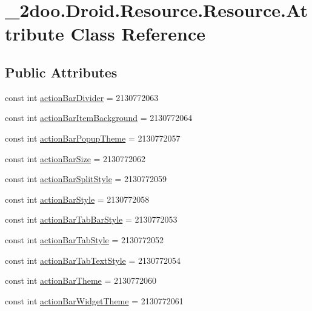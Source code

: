 \hypertarget{class__2doo_1_1_droid_1_1_resource_1_1_attribute}{
\section{\_\-2doo.Droid.Resource.Resource.Attribute Class Reference}
\label{class__2doo_1_1_droid_1_1_resource_1_1_attribute}
}
\subsection*{Public Attributes}
\begin{CompactItemize}
\item 
const int \hyperlink{class__2doo_1_1_droid_1_1_resource_1_1_attribute_56a231fb42d54d2cea70de041f6bf723}{actionBarDivider} = 2130772063
\item 
const int \hyperlink{class__2doo_1_1_droid_1_1_resource_1_1_attribute_3daad9ebff0b1dcb5a9f890d799d451e}{actionBarItemBackground} = 2130772064
\item 
const int \hyperlink{class__2doo_1_1_droid_1_1_resource_1_1_attribute_d85cfd5b41f1289c29c3518c259e7e9f}{actionBarPopupTheme} = 2130772057
\item 
const int \hyperlink{class__2doo_1_1_droid_1_1_resource_1_1_attribute_97e96486337d0366a064ae7a32843a25}{actionBarSize} = 2130772062
\item 
const int \hyperlink{class__2doo_1_1_droid_1_1_resource_1_1_attribute_df230fc290f081e05a70c7d32bf0efe4}{actionBarSplitStyle} = 2130772059
\item 
const int \hyperlink{class__2doo_1_1_droid_1_1_resource_1_1_attribute_ca8d6c2c8f1d77d4b023469362e794e6}{actionBarStyle} = 2130772058
\item 
const int \hyperlink{class__2doo_1_1_droid_1_1_resource_1_1_attribute_97f1f887f9a9c9386ef91d4c5e865d26}{actionBarTabBarStyle} = 2130772053
\item 
const int \hyperlink{class__2doo_1_1_droid_1_1_resource_1_1_attribute_5e0937b0556820fb8374ab519a87e38d}{actionBarTabStyle} = 2130772052
\item 
const int \hyperlink{class__2doo_1_1_droid_1_1_resource_1_1_attribute_52f7e3baaad0c8fbe2807141d866bb7f}{actionBarTabTextStyle} = 2130772054
\item 
const int \hyperlink{class__2doo_1_1_droid_1_1_resource_1_1_attribute_b941f605f0d6abd760c9cea16e81e498}{actionBarTheme} = 2130772060
\item 
const int \hyperlink{class__2doo_1_1_droid_1_1_resource_1_1_attribute_f2bc0b1ab3136f95222f8bccb7b2d7d2}{actionBarWidgetTheme} = 2130772061

\end{CompactItemize}
